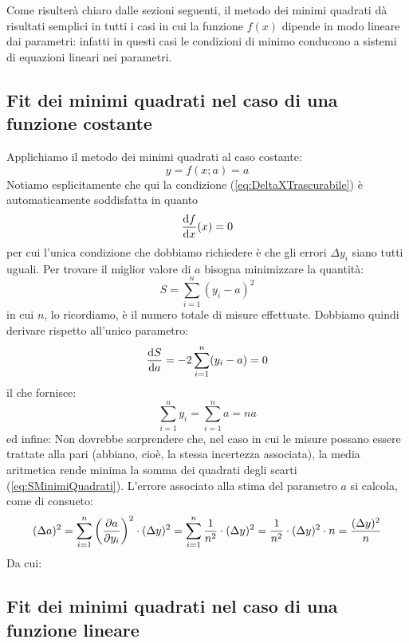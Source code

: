 Come risulter\`a chiaro dalle sezioni seguenti, il metodo dei minimi quadrati
d\`a risultati semplici in tutti i casi in cui la funzione $f(x)$ dipende in
modo lineare dai parametri: infatti in questi casi le condizioni di minimo
conducono a sistemi di equazioni lineari nei parametri.


\subsection{Fit dei minimi quadrati nel caso di una funzione costante}
\label{subsec:FitMinQuadCostante}

Applichiamo il metodo dei minimi quadrati al caso costante:
$$
y = f(x; a) = a
$$
Notiamo esplicitamente che qui la condizione (\ref{eq:DeltaXTrascurabile}) \`e
automaticamente soddisfatta in quanto 
$$
\displaystyle \frac{\mathrm{d} f}{\mathrm{d} x}({x}) = 0
$$
per cui l'unica condizione che dobbiamo richiedere \`e che gli errori
$\Delta y_i$ siano tutti uguali.
Per trovare il miglior valore di $a$ bisogna minimizzare la quantit\`a:
$$
S = \sum_{i=1}^{n}(y_i-a)^2
$$
in cui $n$, lo ricordiamo, \`e il numero totale di misure effettuate.
Dobbiamo quindi derivare rispetto all'unico parametro:
$$
\displaystyle \frac{\mathrm{d} S}{\mathrm{d} a}=-2 \sum_{i=1}^{n} (y_i-a)=0
$$
il che fornisce:
$$
\sum_{i=1}^{n} y_i = \sum_{i=1}^{n} a = n a
$$
ed infine:
Non dovrebbe sorprendere che, nel caso in cui le misure possano
essere trattate alla pari (abbiano, cio\`e, la stessa incertezza
associata), la media aritmetica rende minima la somma dei
quadrati degli scarti (\ref{eq:SMinimiQuadrati}).
L'errore associato alla stima del parametro $a$ si calcola,
come di consueto:
$$
(\Delta a)^2 = \sum_{i=1}^{n} \left(\displaystyle \frac{\partial a}{\partial y_i}\right)^2 \cdot (\Delta y)^2=
\sum_{i=1}^{n} \frac{1}{n^2} \cdot (\Delta y)^2=
\frac{1}{n^2} \cdot (\Delta y)^2 \cdot n = \frac{(\Delta y)^2}{n}
$$
Da cui:


\subsection{Fit dei minimi quadrati nel caso di una funzione lineare}
\label{subsec:FitMinQuadLineare}

